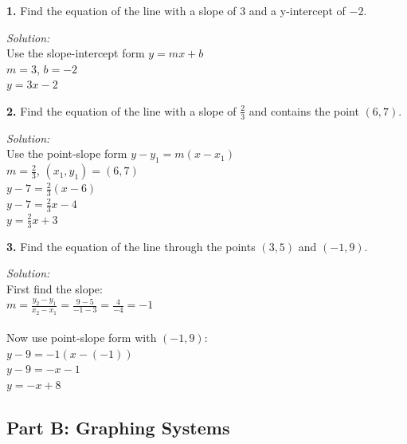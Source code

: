 \documentclass[12pt]{article}
\begin{document}
            \textbf{1.} Find the equation of the line with a slope of 3 and a y-intercept of $-2$.

                \textit{Solution:}\\
                Use the slope-intercept form $y = mx + b$\\
                $m = 3$, $b = -2$\\
                $y = 3x - 2$


                \vspace{0.5cm}

            \textbf{2.} Find the equation of the line with a slope of $\frac{2}{3}$ and contains the point $(6, 7)$.

                \textit{Solution:}\\
                Use the point-slope form $y - y_1 = m(x - x_1)$\\
                $m = \frac{2}{3}$, $(x_1, y_1) = (6, 7)$\\
                $y - 7 = \frac{2}{3}(x - 6)$\\
                $y - 7 = \frac{2}{3}x - 4$\\
                $y = \frac{2}{3}x + 3$


                \vspace{0.5cm}

            \textbf{3.} Find the equation of the line through the points $(3, 5)$ and $(-1, 9)$.

                \textit{Solution:}\\
                First find the slope:\\
                $m = \frac{y_2 - y_1}{x_2 - x_1} = \frac{9 - 5}{-1 - 3} = \frac{4}{-4} = -1$\\
                \\
                Now use point-slope form with $(-1, 9)$:\\
                $y - 9 = -1(x - (-1))$\\
                $y - 9 = -x - 1$\\
                $y = -x + 8$


                \newpage

        \subsection*{Part B: Graphing Systems}
\end{document}
